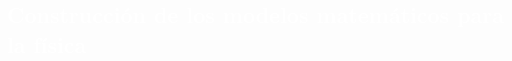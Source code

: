 \begin{titlepage}
\pagecolor{white}
\newcommand{\R}{\ensuremath{\mathbb{R}}}
\BgThispage
{}
\vspace*{-1.1cm}
\noindent
\def\titulo#1{\section{#1}}

\section{\bf\large\textcolor{white}{Construcci\'on de los modelos matem\'aticos para la f\'isica}}
\vspace*{2cm}\par
\noindent


\end{titlepage}
